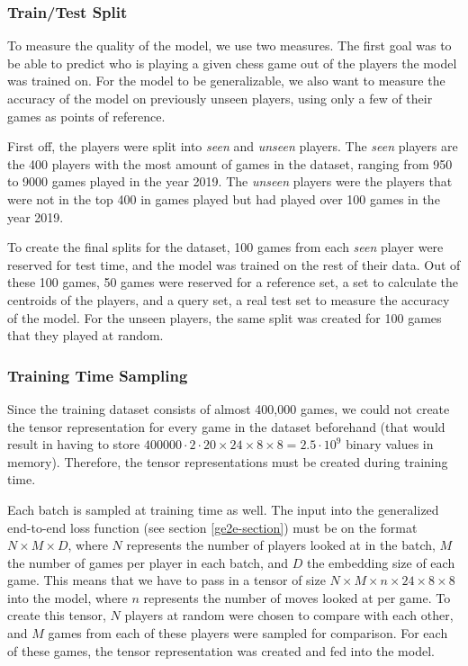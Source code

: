 \subsubsection{Train/Test Split} \label{train-test}
To measure the quality of the model, we use two measures. The first goal was to be able to predict who is playing a given chess game out of the players the model was trained on. For the model to be generalizable, we also want to measure the accuracy of the model on previously unseen players, using only a few of their games as points of reference.
\medskip\par
First off, the players were split into \emph{seen} and \emph{unseen} players. The \emph{seen} players are the 400 players with the most amount of games in the dataset, ranging from 950 to 9000 games played in the year 2019. The \emph{unseen} players were the players that were not in the top 400 in games played but had played over 100 games in the year 2019. 
\medskip\par 
To create the final splits for the dataset, 100 games from each \emph{seen} player were reserved for test time, and the model was trained on the rest of their data. Out of these 100 games, 50 games were reserved for a reference set, a set to calculate the centroids of the players, and a query set, a real test set to measure the accuracy of the model. For the unseen players, the same split was created for 100 games that they played at random.

\subsubsection{Training Time Sampling}
Since the training dataset consists of almost 400,000 games, we could not create the tensor representation for every game in the dataset beforehand (that would result in having to store $400000\cdot2\cdot20\times24\times8\times8 = 2.5 \cdot 10^9   $ binary values in memory). Therefore, the tensor representations must be created during training time. 
\medskip\par
Each batch is sampled at training time as well. The input into the generalized end-to-end loss function (see section \ref{ge2e-section}) must be on the format $N \times M \times D$, where $N$ represents the number of players looked at in the batch, $M$ the number of games per player in each batch, and $D$ the embedding size of each game. This means that we have to pass in a tensor of size $N \times M \times  n \times 24 \times 8 \times 8$ into the model, where $n$ represents the number of moves looked at per game. To create this tensor, $N$ players at random were chosen to compare with each other, and $M$ games from each of these players were sampled for comparison. For each of these games, the tensor representation was created and fed into the model.

